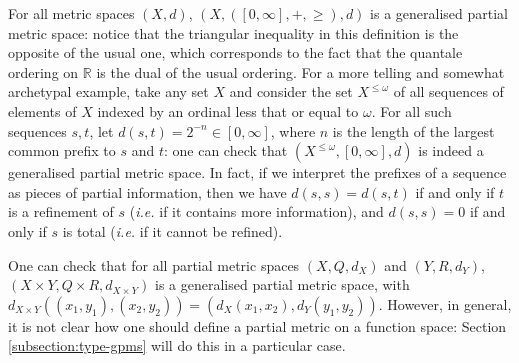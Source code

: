 For all metric spaces $(X,d)$, $(X, ([0,\infty], +, \geq), d)$ is a generalised partial metric space: notice that the triangular inequality in this definition is the opposite of the usual one, which corresponds to the fact that the quantale ordering on $\mathbb{R}$ is the dual of the usual ordering. For a more telling and somewhat archetypal example, take any set $X$ and consider the set $X^{\leq \omega}$ of all sequences of elements of $X$ indexed by an ordinal less that or equal to $\omega$. For all such sequences $s,t$, let $d(s,t) = 2^{-n} \in [0,\infty]$, where $n$ is the length of the largest common prefix to $s$ and $t$: one can check that $(X^{\leq \omega}, [0,\infty], d)$ is indeed a generalised partial metric space. In fact, if we interpret the prefixes of a sequence as pieces of partial information, then we have $d(s,s) = d(s,t)$ if and only if $t$ is a refinement of $s$ (\textit{i.e.} if it contains more information), and $d(s,s) = 0$ if and only if $s$ is total (\textit{i.e.} if it cannot be refined).

One can check that for all partial metric spaces $(X, Q, d_X)$ and $(Y, R, d_Y)$, $(X \times Y, Q \times R, d_{X \times Y})$ is a generalised partial metric space, with $d_{X \times Y}((x_1, y_1), (x_2, y_2)) = (d_X(x_1, x_2), d_Y(y_1, y_2))$. However, in general, it is not clear how one should define a partial metric on a function space: Section \ref{subsection:type-gpms} will do this in a particular case.